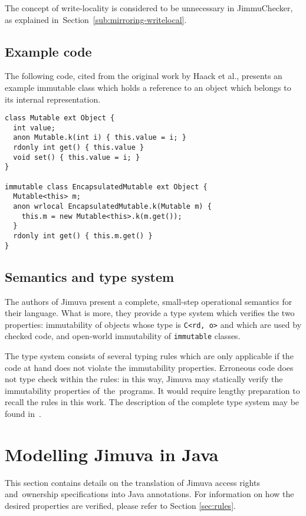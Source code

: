 \documentclass{pracamgr}
\theoremstyle{break}
\theoremstyle{break}
\theoremstyle{break}
\begin{document}
The concept of write-locality is considered to be unnecessary in
JimmuChecker, as explained in~Section~\ref{sub:mirroring-writelocal}.

\subsection{Example code}

The following code, cited from the original work by Haack et al.,
presents an example immutable class which holds a reference to an
object which belongs to its internal representation.

\begin{lstlisting}
class Mutable ext Object {
  int value; 
  anon Mutable.k(int i) { this.value = i; }
  rdonly int get() { this.value }
  void set() { this.value = i; }
}

immutable class EncapsulatedMutable ext Object {
  Mutable<this> m; 
  anon wrlocal EncapsulatedMutable.k(Mutable m) {
    this.m = new Mutable<this>.k(m.get()); 
  }
  rdonly int get() { this.m.get() }
}
\end{lstlisting}

\subsection{Semantics and type system}

The authors of Jimuva present a complete, small-step operational
semantics for their language. What is more, they provide a type system
which verifies the two properties: immutability of objects whose type
is \texttt{C<rd, o>} and which are used by checked code, and
open-world immutability of \texttt{immutable} classes. 

The type system consists of several typing rules which are only
applicable if the code at hand does not violate the immutability
properties. Erroneous code does not type check within the rules: in
this way, Jimuva may statically verify the immutability properties
of~the~programs. It would require lengthy preparation to recall the
rules in this work. The description of the complete type system may be
found in~\cite{haack}.

\section{Modelling Jimuva in Java}
\label{sec:modelling}

This section contains details on the translation of Jimuva access
rights and~ownership spe\-ci\-fi\-ca\-tions into Java annotations. For
information on how the desired properties are verified, please refer
to Section \ref{sec:rules}.
\end{document}
